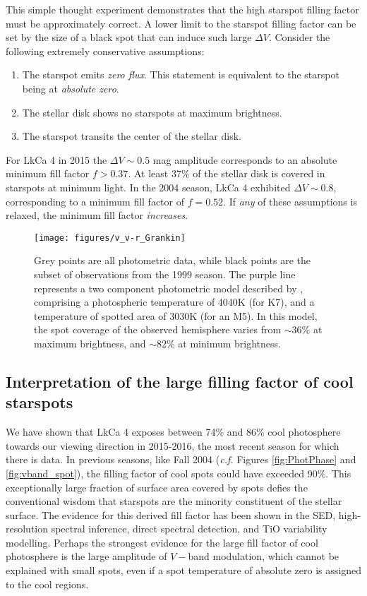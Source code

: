 \documentclass[twocolumn]{emulateapj}%
\begin{document}
This simple thought experiment demonstrates that the high starspot filling factor must be approximately correct.  A lower limit to the starspot filling factor can be set by the size of a black spot that can induce such large $\Delta V$.  Consider the following extremely conservative assumptions:  \begin{enumerate}
  \item The starspot emits \emph{zero flux}.  This statement is equivalent to the starspot being at \emph{absolute zero}.
  \item The stellar disk shows no starspots at maximum brightness.
  \item The starspot transits the center of the stellar disk.
\end{enumerate}

For LkCa 4 in 2015 the $\Delta V\sim 0.5$ mag amplitude corresponds to an absolute minimum fill factor $f>0.37$.  At least 37\% of the stellar disk is covered in starspots at minimum light.  In the 2004 season, LkCa 4 exhibited $\Delta V\sim 0.8$, corresponding to a minimum fill factor of $f=0.52$.  If \emph{any} of these assumptions is relaxed, the minimum fill factor \emph{increases}.  


\begin{figure}
 \centering
\texttt{[image: figures/v\_v-r\_Grankin]} 
\caption{Grey points are all \citet{grankin08} photometric data, while black points are the subset of observations from the 1999 season.  The purple line represents a two component photometric model  described by \citet{grankin08}, comprising a photospheric temperature of 4040K (for K7), and a temperature of spotted area of 3030K (for an M5). In this model, the spot coverage of the observed hemisphere varies from $\sim36\%$ at maximum brightness, and $\sim82\%$ at minimum brightness.}
 \label{fig:grankin_vr}
\end{figure}




\subsection{Interpretation of the large filling factor of cool starspots}
We have shown that LkCa 4 exposes between 74\% and 86\% cool photosphere towards our viewing direction in 2015-2016, the most recent season for which there is data.  In previous seasons, like Fall 2004 (\emph{c.f.} Figures \ref{fig:PhotPhase} and \ref{fig:vband_spot}), the filling factor of cool spots could have exceeded 90\%.  This exceptionally large fraction of surface area covered by spots defies the conventional wisdom that starspots are the minority constituent of the stellar surface.  The evidence for this derived fill factor has been shown in the SED, high-resolution spectral inference, direct spectral detection, and TiO variability modelling.  Perhaps the strongest evidence for the large fill factor of cool photosphere is the large amplitude of $V-$band modulation, which cannot be explained with small spots, even if a spot temperature of absolute zero is assigned to the cool regions.
\end{document}
